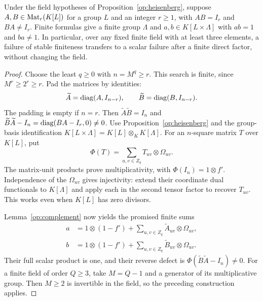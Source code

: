 \begin{corollary}\label{op:scalar}
Under the field hypotheses of Proposition~\ref{op:heisenberg}, suppose
$A,B\in\operatorname{Mat}_r(K[L])$ for a group $L$ and an integer $r\ge1$, with
$AB=I_r$ and $BA\ne I_r$. Finite formulas give a finite group $\Lambda$
and $a,b\in K[L\times\Lambda]$ with $ab=1$ and $ba\ne1$.
In particular, over any fixed finite field with at least three elements,
a failure of stable finiteness transfers to a scalar failure after a
finite direct factor, without changing the field.
\end{corollary}
\begin{proof}
Choose the least $q\ge0$ with $n=M^q\ge r$. This search is finite,
since $M^r\ge2^r\ge r$. Pad the matrices by identities:
\[
 \widetilde A=\operatorname{diag}(A,I_{n-r}),\qquad
 \widetilde B=\operatorname{diag}(B,I_{n-r}).
\]
The padding is empty if $n=r$. Then
$\widetilde A\widetilde B=I_n$ and
$\widetilde B\widetilde A-I_n=\operatorname{diag}(BA-I_r,0)\ne0$.
Use Proposition~\ref{op:heisenberg} and the group-basis identification
$K[L\times\Lambda]=K[L]\otimes_K K[\Lambda]$. For an $n$-square
matrix $T$ over $K[L]$, put
\[
 \Phi(T)=\sum_{u,v\in Z_q}T_{uv}\otimes\Omega_{uv}.
\]
The matrix-unit products prove multiplicativity, with
$\Phi(I_n)=1\otimes f'$. Independence of the $\Omega_{uv}$ gives
injectivity: extend their coordinate dual functionals to $K[\Lambda]$
and apply each in the second tensor factor to recover $T_{uv}$.
This works even when $K[L]$ has zero divisors.

Lemma~\ref{op:complement} now yields the promised finite sums
\begin{equation}\label{op:scalar-formulas}
 \begin{split}
 a&=1\otimes(1-f')+
       \sum_{u,v\in Z_q}\widetilde A_{uv}\otimes\Omega_{uv},\\
 b&=1\otimes(1-f')+
       \sum_{u,v\in Z_q}\widetilde B_{uv}\otimes\Omega_{uv}.
 \end{split}
\end{equation}
Their full scalar product is one, and their reverse defect is
$\Phi(\widetilde B\widetilde A-I_n)\ne0$.
For a finite field of order $Q\ge3$, take $M=Q-1$ and a generator
of its multiplicative group. Then $M\ge2$ is invertible in the field,
so the preceding construction applies.
\end{proof}

